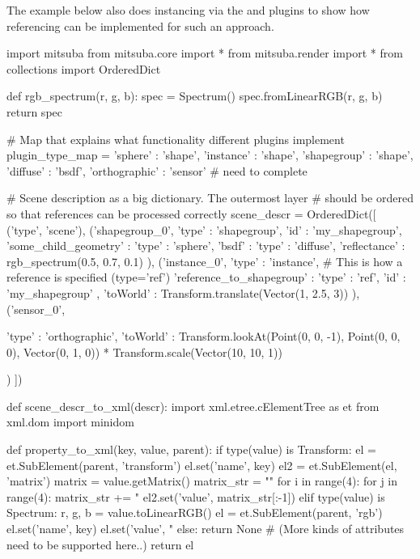 The example below also does instancing via the 
and  plugins to show how referencing can be implemented
for such an approach.
\begin{python}
import mitsuba
from mitsuba.core import *
from mitsuba.render import *
from collections import OrderedDict

def rgb_spectrum(r, g, b):
    spec = Spectrum()
    spec.fromLinearRGB(r, g, b)
    return spec

# Map that explains what functionality different plugins implement
plugin_type_map ={
    'sphere' : 'shape',
    'instance' : 'shape',
    'shapegroup' : 'shape',
    'diffuse' : 'bsdf',
    'orthographic' : 'sensor' # need to complete
}

# Scene description as a big dictionary. The outermost layer
# should be ordered so that references can be processed correctly
scene_descr = OrderedDict([
    ('type', 'scene'),
    ('shapegroup_0', {
        'type' : 'shapegroup',
        'id' : 'my_shapegroup',
        'some_child_geometry' : {
            'type' : 'sphere',
            'bsdf' : {
                'type' : 'diffuse',
                'reflectance' : rgb_spectrum(0.5, 0.7, 0.1)
            }
        }
    }),
    ('instance_0', {
        'type' : 'instance',
        # This is how a reference is specified (type='ref')
        'reference_to_shapegroup' : {
            'type' : 'ref',
            'id' : 'my_shapegroup'
        },
        'toWorld' : Transform.translate(Vector(1, 2.5, 3))
    }),
    ('sensor_0', {
        'type' : 'orthographic',
        'toWorld' : Transform.lookAt(Point(0, 0, -1),
            Point(0, 0, 0), Vector(0, 1, 0)) * Transform.scale(Vector(10, 10, 1))

    })
])

def scene_descr_to_xml(descr):
    import xml.etree.cElementTree as et
    from xml.dom import minidom

    def property_to_xml(key, value, parent):
        if type(value) is Transform:
            el = et.SubElement(parent, 'transform')
            el.set('name', key)
            el2 = et.SubElement(el, 'matrix')
            matrix = value.getMatrix()
            matrix_str = ""
            for i in range(4):
                for j in range(4):
                    matrix_str += "%
            el2.set('value', matrix_str[:-1])
        elif type(value) is Spectrum:
            r, g, b = value.toLinearRGB()
            el = et.SubElement(parent, 'rgb')
            el.set('name', key)
            el.set('value', "%
        else:
            return None # (More kinds of attributes need to be supported here..)
        return el


\end{python}
